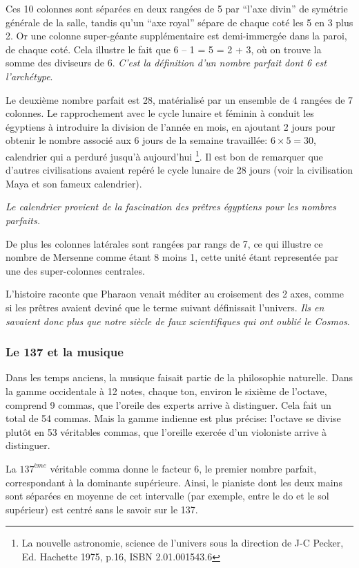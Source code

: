 \documentclass[a4paper,12pt]{article}
\begin{document}
Ces 10 colonnes sont séparées en deux rangées de 5 par ``l'axe divin'' de symétrie générale de la salle, tandis qu'un ``axe royal'' sépare de chaque coté les 5 en 3 plus 2.  Or une colonne super-géante supplémentaire est demi-immergée dans la paroi, de chaque coté. Cela illustre le fait que 6 – 1 = 5 = 2 + 3, où on trouve la somme des diviseurs de 6. \textit{C'est la définition d'un nombre parfait dont 6 est l'archétype}.


      Le deuxième nombre parfait est 28, matérialisé par un ensemble de 4 rangées de 7 colonnes. Le rapprochement avec le cycle lunaire et féminin à conduit les égyptiens à introduire la division de l'année en mois, en ajoutant 2 jours pour obtenir le nombre associé aux 6 jours de la semaine travaillée: $6 \times 5 = 30$, calendrier qui a perduré jusqu'à aujourd'hui \footnote{La nouvelle astronomie, science de l'univers sous la direction de J-C Pecker, Ed. Hachette 1975, p.16, ISBN 2.01.001543.6}. Il est bon de remarquer que d'autres civilisations avaient repéré le cycle lunaire de 28 jours (voir la civilisation Maya et son fameux calendrier).
      
      \textit{Le calendrier provient de la fascination des prêtres égyptiens pour les nombres parfaits.}
      

      De plus les colonnes latérales sont rangées par rangs de 7, ce qui illustre ce nombre de Mersenne comme étant 8 moins 1, cette unité étant representée par une des super-colonnes centrales.
      

L'histoire raconte que Pharaon venait méditer au croisement des 2 axes, comme si les prêtres avaient deviné que le terme suivant définissait l'univers. \textit{Ils en savaient donc plus que notre siècle de faux scientifiques qui ont oublié le Cosmos}.


\subsubsection{Le 137 et la musique}

Dans les temps anciens, la musique faisait partie de la philosophie naturelle. Dans la gamme occidentale à 12 notes, chaque ton, environ le sixième de l'octave, comprend 9 commas, que l'oreile des experts arrive à distinguer. Cela fait un total de 54 commas. Mais la gamme indienne est plus précise: l'octave se divise plutôt en 53 véritables commas, que l'oreille exercée d'un violoniste arrive à distinguer. 


La $137^{ème}$ véritable comma donne le facteur 6, le premier nombre parfait, correspondant à la dominante supérieure. Ainsi, le pianiste dont les deux mains sont séparées en moyenne de cet intervalle (par exemple, entre le do et le sol supérieur) est centré sans le savoir sur le 137.
\end{document}

